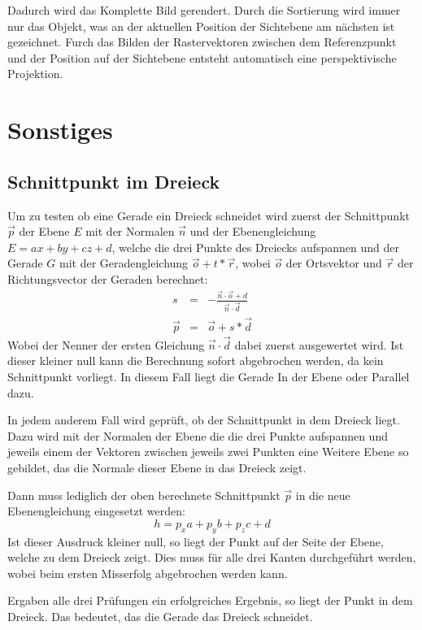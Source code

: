 \documentclass[final,a4paper,11pt,notitlepage,halfparskip]{scrreprt}
\begin{document}
Dadurch wird das Komplette Bild gerendert. Durch die Sortierung wird immer nur
das Objekt, was an der aktuellen Position der Sichtebene am nächsten ist
gezeichnet. Furch das Bilden der Rastervektoren zwischen dem Referenzpunkt und
der Position auf der Sichtebene entsteht automatisch eine perspektivische
Projektion.

\section{Sonstiges}
\subsection{Schnittpunkt im Dreieck}
Um zu testen ob eine Gerade ein Dreieck schneidet wird zuerst der Schnittpunkt
$\vec{p}$ der Ebene $E$ mit der Normalen $\vec{n}$ und der Ebenengleichung $E =
ax + by + cz + d$, welche die drei Punkte des Dreiecks aufspannen und der Gerade 
$G$ mit der Geradengleichung $\vec{o} + t*\vec{r}$, wobei $\vec{o}$ der 
Ortsvektor und $\vec{r}$ der Richtungsvector der Geraden berechnet:
\begin{eqnarray*}
    s       &=& -\frac{\vec{n} \cdot \vec{o} + d}{\vec{n} \cdot \vec{d}}\\
    \vec{p} &=& \vec{o} + s * \vec{d}
\end{eqnarray*}
Wobei der Nenner der ersten Gleichung $\vec{n} \cdot \vec{d}$ dabei zuerst
ausgewertet wird. Ist dieser kleiner null kann die Berechnung sofort abgebrochen
werden, da kein Schnittpunkt vorliegt. In diesem Fall liegt die Gerade In der
Ebene oder Parallel dazu.

In jedem anderem Fall wird geprüft, ob der Schnittpunkt in dem Dreieck liegt.
Dazu wird mit der Normalen der Ebene die die drei Punkte aufspannen und jeweils
einem der Vektoren zwischen jeweils zwei Punkten eine Weitere Ebene so gebildet,
das die Normale dieser Ebene in das Dreieck zeigt.

Dann muss lediglich der oben berechnete Schnittpunkt $\vec{p}$ in die neue
Ebenengleichung eingesetzt werden:
$$h = p_x a + p_y b + p_z c + d$$
Ist dieser Ausdruck kleiner null, so liegt der Punkt auf der Seite der Ebene,
welche zu dem Dreieck zeigt. Dies muss für alle drei Kanten durchgeführt werden,
wobei beim ersten Misserfolg abgebrochen werden kann.

Ergaben alle drei Prüfungen ein erfolgreiches Ergebnis, so liegt der Punkt in
dem Dreieck. Das bedeutet, das die Gerade das Dreieck schneidet.
\end{document}

